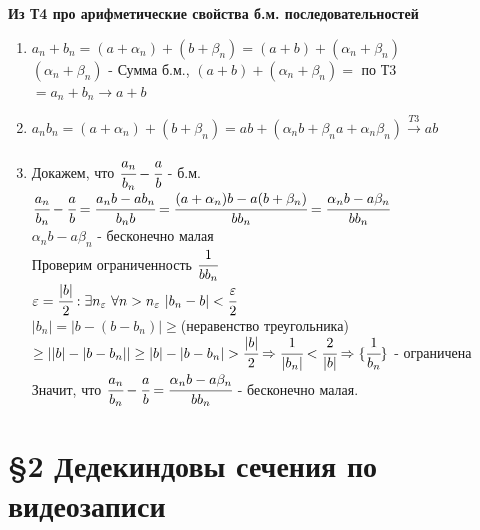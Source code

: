 \documentclass[12pt, paper]{article}
\newcommand{\eps}{\varepsilon}
\begin{document}
\begin{tcolorbox}[title=Доказательство Т5: Арифметические свойства предела, breakable]
\textbf{Из Т4 про арифметические свойства б.м. последовательностей}
\begin{enumerate}
    \item $a_n + b_n = (a + \alpha_n) + (b+\beta_n) = (a+b)+(\alpha_n+\beta_n)$\\
    $(\alpha_n+\beta_n)$ - Сумма б.м., $(a+b)+(\alpha_n+\beta_n) = $ по Т3 $= a_n+b_n \rightarrow a + b$
    \item $a_nb_n = (a + \alpha_n) + (b + \beta_n) = ab + (\alpha_nb + \beta_na + \alpha_n\beta_n) \xrightarrow[]{T3} ab$
    \item Докажем, что $\cfrac{a_n}{b_n} - \cfrac{a}{b}$ - б.м.\\
    $\cfrac{a_n}{b_n} - \cfrac{a}{b} = \cfrac{a_nb-ab_n}{b_nb} = \cfrac{(a+\alpha_n)b-a(b+\beta_n)}{bb_n} = \cfrac{\alpha_nb-a\beta_n}{bb_n}$\\
    $\alpha_nb-a\beta_n$ - бесконечно малая\\
    Проверим ограниченность $\cfrac{1}{bb_n}$\\
    $\eps=\cfrac{|b|}{2}: \exists n_\eps\ \forall n>n_\eps\ |b_n-b|<\cfrac{\eps}{2}$\\
    $|b_n| = |b-(b-b_n)| \geq{}$(неравенство треугольника)$\geq ||b|-|b-b_n||\geq|b|-|b-b_n|>\cfrac{|b|}{2}\Rightarrow\cfrac{1}{|b_n|}<\cfrac{2}{|b|} \Rightarrow \{\cfrac{1}{b_n}\}$ - ограничена\\
    Значит, что $\cfrac{a_n}{b_n} - \cfrac{a}{b} = \cfrac{\alpha_nb-a\beta_n}{bb_n}$ - бесконечно малая.
\end{enumerate}
\end{tcolorbox}

\newpage
\section*{\S 2 Дедекиндовы сечения по видеозаписи}
\end{document}
